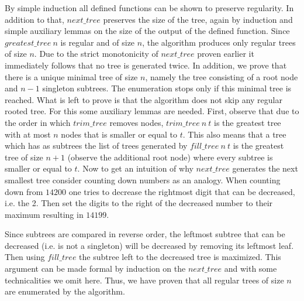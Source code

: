 By simple induction all defined functions can be shown to preserve regularity. In addition to that, $next\_tree$ preserves the size of the tree, again by induction and simple auxiliary lemmas on the size of the output of the defined function.
Since $greatest\_tree\ n$ is regular and of size $n$, the algorithm produces only regular trees of size $n$.
Due to the strict monotonicity of $next\_tree$ proven earlier it immediately follows that no tree is generated twice.
In addition, we prove that there is a unique minimal tree of size $n$, namely the tree consisting of a root node and $n-1$ singleton subtrees.
The enumeration stops only if this minimal tree is reached.
What is left to prove is that the algorithm does not skip any regular rooted tree.
For this some auxiliary lemmas are needed.
First, observe that due to the order in which $trim\_tree$ removes nodes, $trim\_tree\ n\ t$ is the greatest tree with at most $n$ nodes that is smaller or equal to $t$.
This also means that a tree which has as subtrees the list of trees generated by $fill\_tree\ n\ t$ is the greatest tree of size $n + 1$ (observe the additional root node) where every subtree is smaller or equal to $t$.
Now to get an intuition of why $next\_tree$ generates the next smallest tree consider counting down numbers as an analogy.
When counting down from $14200$ one tries to decrease the rightmost digit that can be decreased, i.e. the 2.
Then set the digits to the right of the decreased number to their maximum resulting in $14199$.

Since subtrees are compared in reverse order, the leftmost subtree that can be decreased (i.e. is not a singleton) will be decreased by removing its leftmost leaf.
Then using $fill\_tree$ the subtree left to the decreased tree is maximized.
This argument can be made formal by induction on the $next\_tree$ and with some technicalities we omit here.
Thus, we have proven that all regular trees of size $n$ are enumerated by the algorithm.

